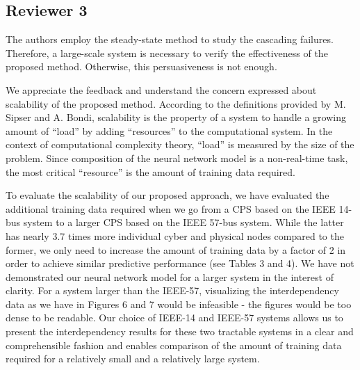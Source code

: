 \documentclass{article}
\newenvironment{response}{
  \doublespacing
  \setlength\parindent{0.05\linewidth}
  \ttfamily
}{}
\begin{document}
\subsection{Reviewer 3}
\label{sec:reviewer:r3}
The authors employ the steady-state method to study the cascading failures. Therefore, a large-scale system is necessary to verify the effectiveness of the proposed method. Otherwise, this persuasiveness is not enough.

\begin{response}
We appreciate the feedback and understand the concern expressed about scalability of the proposed method. According to the definitions provided by M. Sipser\footnotemark{} and A. Bondi\footnotemark{}, scalability is the property of a system to handle a growing amount of ``load'' by adding ``resources'' to the computational system. In the context of computational complexity theory, ``load'' is measured by the size of the problem. Since composition of the neural network model  is a non-real-time task, the most critical ``resource'' is the amount of training data required. 

To  evaluate the scalability of our proposed approach, we have evaluated the additional training data required when we go from a CPS based on the IEEE 14-bus system to a larger CPS based on the IEEE 57-bus system. While the latter has nearly 3.7 times more individual cyber and physical nodes compared to the former, we only need to increase the amount of training data  by a factor of 2 in order to achieve  similar predictive performance (see Tables 3 and 4). We have not demonstrated  our neural network model for a larger system in the interest of clarity. For a system larger than the IEEE-57, visualizing the interdependency data as we have in Figures 6 and 7 would be infeasible - the figures would be too dense to be readable. Our choice of IEEE-14 and IEEE-57 systems allows us to present the interdependency results for these two tractable systems in a clear and comprehensible fashion and enables comparison of the amount of training data required for a relatively small and a relatively large system.

\end{response}

\addtocounter{footnote}{-1}
\addtocounter{footnote}{+1}
\end{document}
